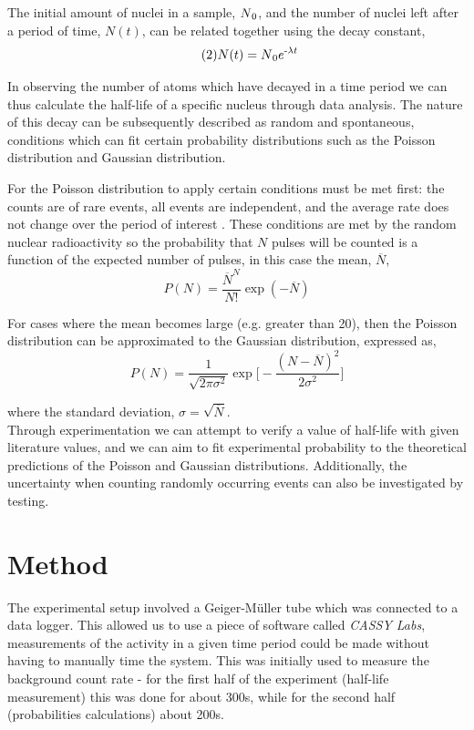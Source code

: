 \documentclass[twocolumn]{revtex4}
\begin{document}
The initial amount of nuclei in a sample, $N\textsubscript{0}$, and the number of nuclei left after a period of time, $N(t)$, can be related together using the decay constant,
\begin{equation} \tag{2}
N(t)=N\textsubscript{0}e\textsuperscript{-$\lambda t$}
\end{equation}

In observing the number of atoms which have decayed in a time period we can thus calculate the half-life of a specific nucleus through data analysis. The nature of this decay can be subsequently described as random and spontaneous, conditions which can fit certain probability distributions such as the Poisson distribution and Gaussian distribution. 

For the Poisson distribution to apply certain conditions must be met first: the counts are of rare events, all events are independent, and the average rate does not change over the period of interest \cite{decay}. These conditions are met by the random nuclear radioactivity so the probability that $N$ pulses will be counted is a function of the expected number of pulses, in this case the mean, $\overline{N}$, 
\begin{equation} \tag{3} 
P(N)=\frac{\overline{N}^N}{N!} \exp(-\overline{N})
\end{equation}

For cases where the mean becomes large (e.g. greater than 20), then the Poisson distribution can be approximated to the Gaussian distribution, expressed as,
\begin{equation} \tag{4}
P(N)=\frac{1}{\sqrt{2\pi\sigma ^2}} \exp\Big[-\frac{(N-\overline{N})^2}{2\sigma ^2}\Big]
\end{equation}

where the standard deviation, $\sigma=\sqrt{\overline{N}}$.  
\\
Through experimentation we can attempt to verify a value of half-life with given literature values, and we can aim to fit experimental probability to the theoretical predictions of the Poisson and Gaussian distributions. Additionally, the uncertainty when counting randomly occurring events can also be investigated by testing. 
\vspace{-3ex}
\section{Method} 
\vspace{-2ex}
The experimental setup involved a Geiger-M\"{u}ller tube which was connected to a data logger. This allowed us to use a piece of software called \textit{CASSY Labs}, measurements of the activity in a given time period could be made without having to manually time the system. This was initially used to measure the background count rate - for the first half of the experiment (half-life measurement) this was done for about 300s, while for the second half (probabilities calculations) about 200s. 
\end{document}
